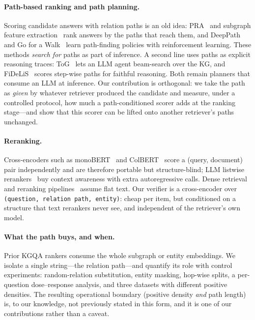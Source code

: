 \documentclass[sigconf,review,anonymous]{acmart}
\begin{document}
\paragraph{Path-based ranking and path planning.}
Scoring candidate answers with relation paths is an old idea: PRA~\cite{lao2011pra} and subgraph feature extraction~\cite{gardner2015subgraph} rank answers by the paths that reach them, and DeepPath~\cite{xiong2017deeppath} and Go for a Walk~\cite{das2018gowalk} learn path-finding policies with reinforcement learning. These methods \emph{search for} paths as part of inference. A second line uses paths as explicit reasoning traces: ToG~\cite{sun2024tog} lets an LLM agent beam-search over the KG, and FiDeLiS~\cite{sui2024fidelis} scores step-wise paths for faithful reasoning. Both remain planners that consume an LLM at inference. Our contribution is orthogonal: we take the path as \emph{given} by whatever retriever produced the candidate and measure, under a controlled protocol, how much a path-conditioned scorer adds at the ranking stage---and show that this scorer can be lifted onto another retriever's paths unchanged.

\paragraph{Reranking.}
Cross-encoders such as monoBERT~\cite{nogueira2019passage} and ColBERT~\cite{khattab2020colbert} score a (query, document) pair independently and are therefore portable but structure-blind; LLM listwise rerankers~\cite{sun2023rankgpt} buy context awareness with extra autoregressive calls. Dense retrieval and reranking pipelines~\cite{karpukhin2020dpr} assume flat text. Our verifier is a cross-encoder over \texttt{(question, relation path, entity)}: cheap per item, but conditioned on a structure that text rerankers never see, and independent of the retriever's own model.

\paragraph{What the path buys, and when.}
Prior KGQA rankers consume the whole subgraph or entity embeddings. We isolate a single string---the relation path---and quantify its role with control experiments: random-relation substitution, entity masking, hop-wise splits, a per-question dose--response analysis, and three datasets with different positive densities. The resulting operational boundary (positive density \emph{and} path length) is, to our knowledge, not previously stated in this form, and it is one of our contributions rather than a caveat.
\end{document}
